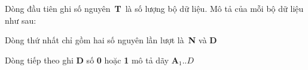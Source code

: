 Dòng đầu tiên ghi số nguyên \textbf{T} là số lượng bộ dữ liệu. Mô tả của mỗi bộ dữ liệu như sau: 

Dòng thứ nhất chỉ gồm hai số nguyên lần lượt là \textbf{N} và \textbf{D}

Dòng tiếp theo ghi \textbf{D} số \textbf{0} hoặc \textbf{1} mô tả dãy \textbf{A$_1..D$}
